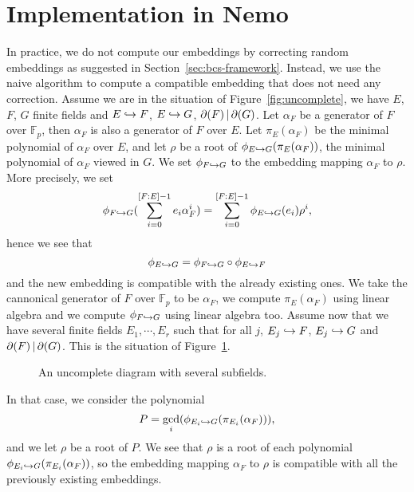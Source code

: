 \documentclass[11pt]{article}
\begin{document}
\section{Implementation in Nemo}
\label{sec:implem}
In practice, we do not compute our embeddings by correcting random embeddings as
suggested in Section~\ref{sec:bcs-framework}. Instead, we use the naive
algorithm to compute a compatible embedding that does not need any correction.
Assume we are in the situation of Figure~\ref{fig:uncomplete}, \ie we have $E$,
$F$, $G$ finite fields and $E\hookrightarrow F$, $E\hookrightarrow G$, $\partial(F)\,|\,\partial(G)$. Let $\alpha_F$
be a generator of $F$ over $\mathbb{F}_p$, then $\alpha_F$ is also a generator
of $F$ over $E$. Let $\pi_{E}(\alpha_F)$ be the minimal polynomial of $\alpha_F$
over $E$, and let $\rho$ be a root of $\phi_{E\hookrightarrow G}(\pi_E(\alpha_F))$, the
minimal polynomial of $\alpha_F$ viewed in $G$. We set $\phi_{F\hookrightarrow G}$ to the
embedding mapping $\alpha_F$ to $\rho$. More precisely, we set
\[
  \phi_{F\hookrightarrow G}(\sum_{i=0}^{[F:E]-1}e_i\alpha_F^i) =
  \sum_{i=0}^{[F:E]-1}\phi_{E\hookrightarrow G}(e_i)\rho^i,
\]
hence we see that
\[
  \phi_{E\hookrightarrow G} = \phi_{F\hookrightarrow G}\circ\phi_{E\hookrightarrow F}
\]
and the new embedding is compatible with the already existing ones. We take
the cannonical generator of $F$ over $\mathbb{F}_p$ to be $\alpha_F$, we compute
$\pi_E(\alpha_F)$ using linear algebra and we compute $\phi_{F\hookrightarrow G}$ using
linear algebra too. Assume now that we have several finite fields $E_1, \cdots, E_r$ such
that for all $j$, $E_j\hookrightarrow F$, $E_j\hookrightarrow G$ and $\partial(F)\,|\,\partial(G)$. This is the
situation of Figure~\ref{fig:uncomplete-sev}.
\begin{figure}
  \centering
  \caption{An uncomplete diagram with several subfields.}
  \label{fig:uncomplete-sev}
\end{figure}
In that case, we consider the polynomial
\[
  P = \gcd_i(\phi_{E_i\hookrightarrow G}(\pi_{E_i}(\alpha_F))),
\]
and we let $\rho$ be a root of $P$. We see that $\rho$ is a root of each
polynomial $\phi_{E_i\hookrightarrow G}(\pi_{E_i}(\alpha_F))$, so the embedding mapping
$\alpha_F$ to $\rho$ is compatible with all the previously existing embeddings.
\end{document}
